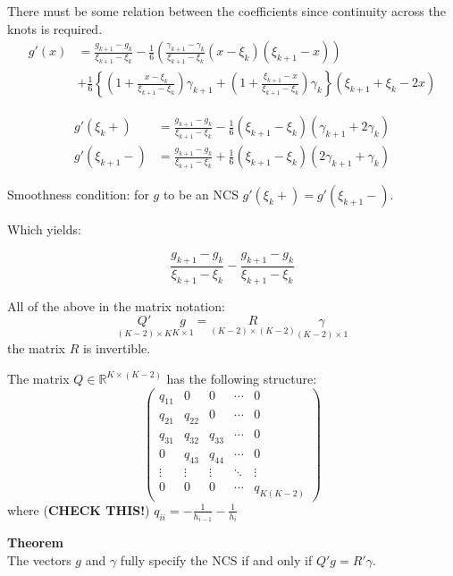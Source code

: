 \documentclass[a4paper]{article}
\newcommand{\obj}[1]{{\left\{ #1 \right \}}}
\newcommand{\brac}[1]{{\left ( #1 \right )}}
\newcommand{\Real}{\mathbb{R}}
\begin{document}
There must be some relation between the coefficients since continuity across the knots is required.
\begin{align*}
g'(x) &= \frac{g_{k+1}-g_k}{\xi_{k+1}-\xi_k}
	-\frac{1}{6} \brac{ \frac{\gamma_{k+1}-\gamma_k}{\xi_{k+1}-\xi_k} (x-\xi_k)(\xi_{k+1}-x) }\\
	&+ \frac{1}{6}\obj{
		\brac{1+\frac{x-\xi_k}{\xi_{k+1}-\xi_k}}\gamma_{k+1}
		+ \brac{1+\frac{\xi_{k+1}-x}{\xi_{k+1}-\xi_k}}\gamma_k
	} \brac{\xi_{k+1} + \xi_k - 2 x}
\end{align*}

\begin{align*}
g'(\xi_k+) &= \frac{g_{k+1}-g_k}{\xi_{k+1}-\xi_k} - \frac{1}{6} \brac{\xi_{k+1}-\xi_k}\brac{\gamma_{k+1}+2\gamma_k}\\
g'(\xi_{k+1}-) &=\frac{g_{k+1}-g_k}{\xi_{k+1}-\xi_k} + \frac{1}{6} \brac{\xi_{k+1}-\xi_k}\brac{2\gamma_{k+1}+\gamma_k}
\end{align*}

Smoothness condition: for $g$ to be an NCS $g'(\xi_k+)=g'(\xi_{k+1}-)$.

Which yields:

\[ \frac{g_{k+1}-g_k}{\xi_{k+1}-\xi_k} - \frac{g_{k+1}-g_k}{\xi_{k+1}-\xi_k}\]


All of the above in the matrix notation:
\[\underset{(K-2)\times K}{Q'}\underset{K\times1}{g} = \underset{(K-2)\times(K-2)}{R}\underset{(K-2)\times1}{\gamma}\]
the matrix $R$ is invertible.

The matrix $Q\in \Real^{K\times (K-2)}$ has the following structure:
\[
\begin{pmatrix}
q_{11} 	& 0 		& 0 		& \cdots & 0 \\
q_{21} 	& q_{22} 	& 0 		& \cdots & 0 \\
q_{31} 	& q_{32} 	& q_{33} 	& \cdots & 0 \\
0 		& q_{43} 	& q_{44} 	& \cdots & 0 \\
\vdots 	& \vdots	& \vdots 	& \ddots & \vdots \\
0 		& 0			& 0 		& \cdots & q_{K(K-2)}
\end{pmatrix}
\]
where (\textbf{CHECK THIS!}) $q_{ii} = -\frac{1}{h_{i-1}}-\frac{1}{h_i}$

\noindent\textbf{Theorem}\hfill \\
The vectors $g$ and $\gamma$ fully specify the NCS if and only if $Q'g = R'\gamma$.
\end{document}
